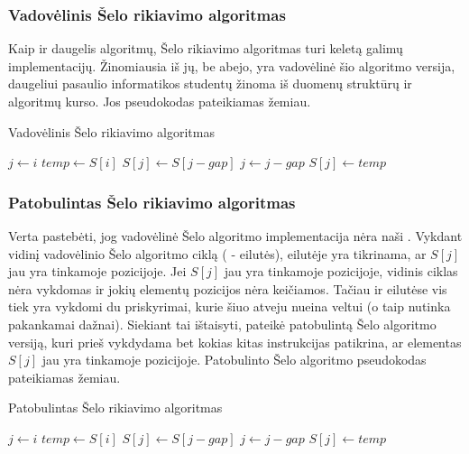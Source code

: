 \documentclass{VUMIFInfKursinis}
\begin{document}
\subsubsection{Vadovėlinis Šelo rikiavimo algoritmas}

Kaip ir daugelis algoritmų, Šelo rikiavimo algoritmas turi keletą galimų implementacijų.
Žinomiausia iš jų, be abejo, yra vadovėlinė šio algoritmo versija,
daugeliui pasaulio informatikos studentų žinoma iš duomenų struktūrų ir algoritmų kurso.
Jos pseudokodas pateikiamas žemiau.

\begin{algorithm}[H]
  \caption{Vadovėlinis Šelo rikiavimo algoritmas}\label{alg:tss}
  \begin{algorithmic}[1]
      \State $j\gets i$
      \State $temp\gets S[i]$\label{alg:tss:assign1}
      \label{alg:tss:while:start}
        \State $S[j]\gets S[j - gap]$
        \State $j\gets j-gap$
      \EndWhile\label{alg:tss:while:end}
      \State $S[j]\gets temp$\label{alg:tss:assign2}
    \EndFor
  \EndFor
  \end{algorithmic}
\end{algorithm}

\subsubsection{Patobulintas Šelo rikiavimo algoritmas}

Verta pastebėti, jog vadovėlinė Šelo algoritmo implementacija nėra naši \cite{Radavičius_Baranauskas_2013}.
Vykdant vidinį vadovėlinio Šelo algoritmo ciklą ( -  eilutės),
 eilutėje yra tikrinama, ar $S[j]$ jau yra tinkamoje pozicijoje.
Jei $S[j]$ jau yra tinkamoje pozicijoje, vidinis ciklas nėra vykdomas ir jokių elementų pozicijos nėra keičiamos.
Tačiau  ir  eilutėse vis tiek yra vykdomi du priskyrimai,
kurie šiuo atveju nueina veltui (o taip nutinka pakankamai dažnai).
Siekiant tai ištaisyti, \cite{Radavičius_Baranauskas_2013} pateikė patobulintą Šelo algoritmo versiją, kuri prieš vykdydama
bet kokias kitas instrukcijas patikrina, ar elementas $S[j]$ jau yra tinkamoje pozicijoje.
Patobulinto Šelo algoritmo pseudokodas pateikiamas žemiau.

\begin{algorithm}[H]
  \caption{Patobulintas Šelo rikiavimo algoritmas}\label{alg:iss}
  \begin{algorithmic}[1]
        \State $j\gets i$
        \State $temp\gets S[i]$
        \Repeat
          \State $S[j]\gets S[j - gap]$
          \State $j\gets j-gap$
        \State $S[j]\gets temp$
      \EndIf
    \EndFor
  \EndFor
  \end{algorithmic}
\end{algorithm}
\end{document}
